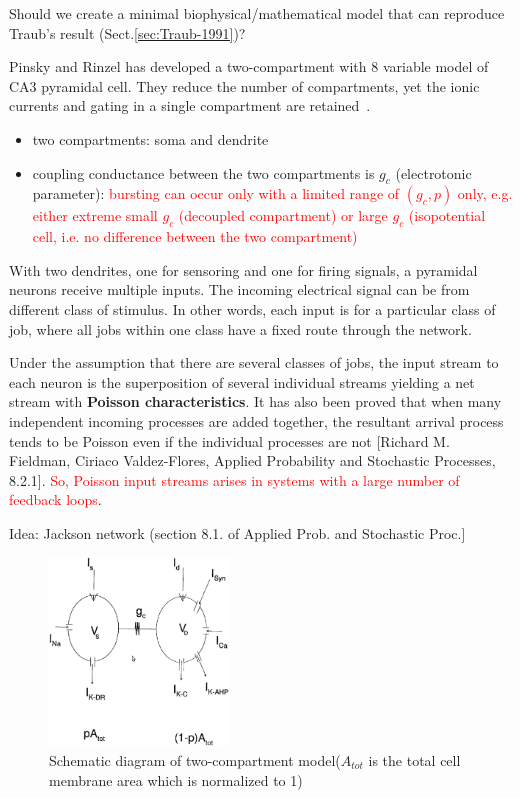 Should we create a minimal biophysical/mathematical model that can reproduce
Traub's result (Sect.\ref{sec:Traub-1991})? 

Pinsky and Rinzel has developed a two-compartment with 8 variable model of CA3
pyramidal cell. They reduce the number of compartments, yet the ionic currents
and gating in a single compartment are retained~\citep{pinsky1994inr}.
\begin{itemize}
\item two compartments: soma and dendrite
\item coupling conductance between the two compartments is $g_c$
  (electrotonic parameter):
  \textcolor{red}{bursting can occur only with a limited range of
    $(g_c,p)$ only, e.g. either extreme small $g_c$ (decoupled
    compartment) or large $g_c$ (isopotential cell, i.e. no difference
    between the two compartment)}
\end{itemize}

With two dendrites, one for sensoring and one for firing signals, a
pyramidal neurons receive multiple inputs. The incoming electrical
signal can be from different class of stimulus. In other words, each
input is for a particular class of job, where all jobs within one
class have a fixed route through the network.

Under the assumption that there are several classes of jobs, the input
stream to each neuron is the superposition of several individual
streams yielding a net stream with {\bf Poisson characteristics}. It
has also been proved that when many independent incoming processes are
added together, the resultant arrival process tends to be Poisson even
if the individual processes are not [Richard M. Fieldman, Ciriaco
Valdez-Flores, Applied Probability and Stochastic Processes, 8.2.1].
\textcolor{red}{So, Poisson input streams arises in systems with a
  large number of feedback loops}.

Idea: Jackson network (section 8.1. of Applied Prob. and Stochastic
Proc.]

\begin{figure}[hbt]
  \centerline{\includegraphics[height=5cm,
    angle=0]{./images/pinsky-rinzel.eps}}
  \caption{Schematic diagram of two-compartment model($A_{tot}$ is the
    total cell membrane area which is normalized to 1)}
  \label{fig:pinsky-rinzel}
\end{figure}

